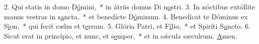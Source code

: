 2. Qui statis in domo D\uline{ó}mini,~* in átriis domus Di n\uline{o}stri.
3. In nóctibus extóllite manus vestras in s\uline{a}ncta,~* et benedícte D\uline{ó}minum.
4. Benedícat te Dóminus ex S\uline{i}on,~* qui fecit cælm et t\uline{e}rram.
5. Glória Patri, et F\uline{í}lio,~* et Spiríti S\uline{a}ncto.
6. Sicut erat in princípio, et nunc, et s\uline{e}mper,~* et in sǽcula sæculrum. \uline{A}men.
